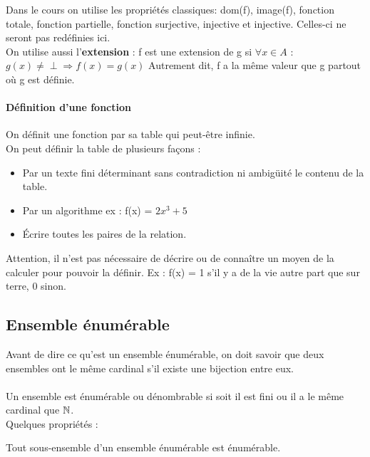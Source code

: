 Dans le cours on utilise les propriétés classiques: dom(f), image(f), fonction totale,
fonction partielle, fonction surjective, injective et injective. Celles-ci ne 
seront pas redéfinies ici.\\
On utilise aussi l'\textbf{extension} : 
f est une extension de g si $\forall x \in A$ : $g(x)\neq \perp \Rightarrow f(x) = g(x)$
Autrement dit, f a la même valeur que g partout où g est définie.

\paragraph{Définition d'une fonction}
\label{par:d_finition_d_une_fonciton}
On définit une fonction par sa table qui peut-être infinie.\\
On peut définir la table de plusieurs façons :
\begin{itemize}
	\item Par un texte fini déterminant sans contradiction ni ambigüité le contenu
		de la table.
	\item Par un algorithme ex : f(x) = $2x^3+5$
	\item Écrire toutes les paires de la relation.
\end{itemize}
Attention, il n'est pas nécessaire de décrire ou de connaître un moyen de la calculer
pour pouvoir la définir. Ex : f(x) = 1 s'il y a de la vie autre part que sur terre,
0 sinon.

\subsection{Ensemble énumérable}
\label{sub:ensemble_num_rables}

Avant de dire ce qu'est un ensemble énumérable, on doit savoir que deux ensembles
ont le même cardinal s’il existe une bijection entre eux.

\paragraph{}
Un ensemble est énumérable ou dénombrable si soit il est fini ou il a le même cardinal que $\mathbb{\mathbb{N}}$. \\
Quelques propriétés : 
\begin{myprop}
	Tout sous-ensemble d'un ensemble énumérable est énumérable.
\end{myprop}

